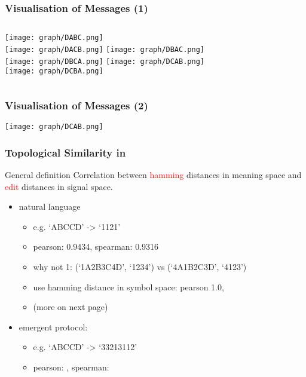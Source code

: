 \documentclass[compress,mathserif,xcolor=dvipsnames,svgnames,aspectratio=43]{beamer}
\begin{document}
\begin{frame}[c]
  \frametitle{Visualisation of Messages (1)}
  \begin{columns}
    \texttt{[image: graph/DABC.png]} \\
    \texttt{[image: graph/DACB.png]}
    \texttt{[image: graph/DBAC.png]} \\
    \texttt{[image: graph/DBCA.png]}
    \texttt{[image: graph/DCAB.png]} \\
    \texttt{[image: graph/DCBA.png]}
  \end{columns}
\end{frame}

\begin{frame}[c]
  \frametitle{Visualisation of Messages (2)}
  \texttt{[image: graph/DCAB.png]}
\end{frame}

\begin{frame}[c]
  \frametitle{Topological Similarity in \cite{brighton2006understanding}}
  \begin{block}{General definition}
    Correlation between \textcolor{red}{hamming} distances in meaning space and \textcolor{red}{edit} distances in signal space.
  \end{block}
  \begin{itemize}
    \item natural language
      \begin{itemize}
        \item e.g. `ABCCD' -> `1121'
        \item pearson: 0.9434, spearman: 0.9316
        \item why not 1: (`1A2B3C4D', `1234') vs (`4A1B2C3D', `4123')
        \item use hamming distance in symbol space: pearson 1.0, 
        \item (more on next page)
      \end{itemize}
    \item emergent protocol:
    \begin{itemize}
      \item e.g. `ABCCD' -> `33213112'
      \item pearson: , spearman: 
    \end{itemize}
  \end{itemize}
\end{frame}
\end{document}
